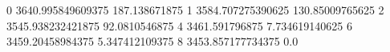 0 3640.995849609375 187.138671875
1 3584.707275390625 130.85009765625
2 3545.938232421875 92.0810546875
4 3461.591796875 7.734619140625
6 3459.20458984375 5.347412109375
8 3453.857177734375 0.0
